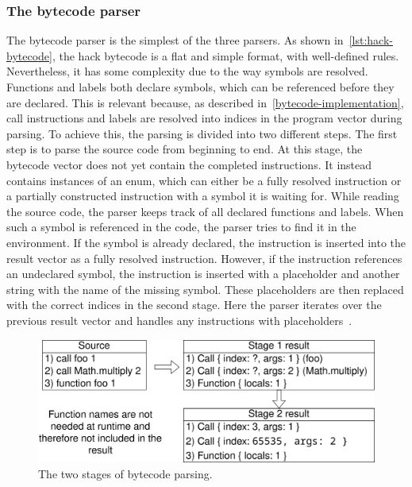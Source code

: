 \subsubsection{The bytecode parser} \label{bytecode-parser}
The bytecode parser is the simplest of the three parsers.
As shown in~\cref{lst:hack-bytecode}, the hack bytecode is a flat and simple format, with well-defined rules.
Nevertheless, it has some complexity due to the way symbols are resolved.
Functions and labels both declare symbols, which can be referenced before they are declared.
This is relevant because, as described in~\cref{bytecode-implementation}, call instructions and labels are resolved into indices in the program vector during parsing.
To achieve this, the parsing is divided into two different steps.
The first step is to parse the source code from beginning to end.
At this stage, the bytecode vector does not yet contain the completed instructions.
It instead contains instances of an enum, which can either be a fully resolved instruction or a partially constructed instruction with a symbol it is waiting for.
While reading the source code, the parser keeps track of all declared functions and labels.
When such a symbol is referenced in the code, the parser tries to find it in the environment.
If the symbol is already declared, the instruction is inserted into the result vector as a fully resolved instruction.
However, if the instruction references an undeclared symbol, the instruction is inserted with a placeholder and another string with the name of the missing symbol.
These placeholders are then replaced with the correct indices in the second stage.
Here the parser iterates over the previous result vector and handles any instructions with placeholders~\cite{aho2006compilers}.
\begin{center}
  \begin{figure}[ht]
    \centering
    \includegraphics[width=12cm]{fig/bytecode-parsing.png}
    \caption{The two stages of bytecode parsing.}
    \label{fig:bytecode-parsing}
  \end{figure}
\end{center}
